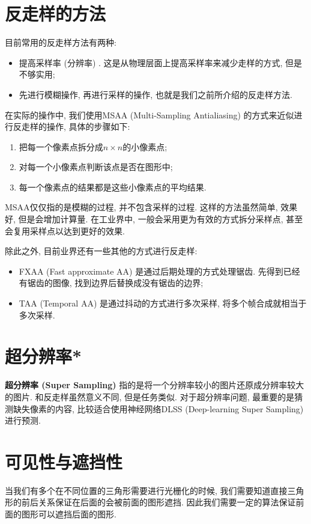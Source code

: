 \documentclass[openany]{progbookcn}
\begin{document}
\section{反走样的方法}
目前常用的反走样方法有两种: 
\begin{itemize}
	\item 提高采样率 (分辨率) . 这是从物理层面上提高采样率来减少走样的方式, 但是不够实用; 
	\item 先进行模糊操作, 再进行采样的操作, 也就是我们之前所介绍的反走样方法. 
\end{itemize}
在实际的操作中, 我们使用MSAA (Multi-Sampling Antialiasing) 的方式来近似进行反走样的操作, 具体的步骤如下: 
\begin{enumerate}
	\item 把每一个像素点拆分成$n\times n$的小像素点; 
	\item 对每一个小像素点判断该点是否在图形中; 
	\item 每一个像素点的结果都是这些小像素点的平均结果. 
\end{enumerate}
MSAA仅仅指的是模糊的过程, 并不包含采样的过程. 这样的方法虽然简单, 效果好, 但是会增加计算量. 在工业界中, 一般会采用更为有效的方式拆分采样点, 甚至会复用采样点以达到更好的效果. 

除此之外, 目前业界还有一些其他的方式进行反走样: 
\begin{itemize}
	\item FXAA (Fast approximate AA) 是通过后期处理的方式处理锯齿. 先得到已经有锯齿的图像, 找到边界后替换成没有锯齿的边界; 
	\item TAA (Temporal AA) 是通过抖动的方式进行多次采样, 将多个帧合成就相当于多次采样. 
\end{itemize}

\section{超分辨率*}
\textbf{超分辨率 (Super Sampling) }指的是将一个分辨率较小的图片还原成分辨率较大的图片. 和反走样虽然意义不同, 但是任务类似. 对于超分辨率问题, 最重要的是猜测缺失像素的内容, 比较适合使用神经网络DLSS (Deep-learning Super Sampling) 进行预测. 

\section{可见性与遮挡性}
当我们有多个在不同位置的三角形需要进行光栅化的时候, 我们需要知道直接三角形的前后关系保证在后面的会被前面的图形遮挡. 因此我们需要一定的算法保证前面的图形可以遮挡后面的图形. 
\end{document}

